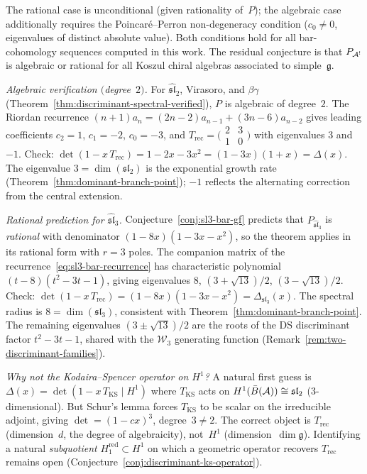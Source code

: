 \begin{remark}%
\label{rem:discriminant-spectral-scope}
The rational case is unconditional (given rationality of~$P$);
the algebraic case additionally requires the Poincar\'e--Perron
non-degeneracy condition ($c_0 \neq 0$, eigenvalues of distinct
absolute value).  Both conditions hold for all bar-cohomology
sequences computed in this work.  The residual conjecture is
that $P_{\mathcal{A}^!}$ is algebraic or rational for all Koszul chiral
algebras associated to simple~$\mathfrak{g}$.

\emph{Algebraic verification $($degree~$2)$.}
For $\widehat{\mathfrak{sl}}_2$, Virasoro, and $\beta\gamma$
(Theorem~\ref{thm:discriminant-spectral-verified}), $P$ is
algebraic of degree~$2$.
The Riordan recurrence
$(n{+}1) a_n = (2n{-}2) a_{n-1} + (3n{-}6) a_{n-2}$
gives leading coefficients $c_2 = 1$, $c_1 = -2$, $c_0 = -3$,
and $T_{\mathrm{rec}} = \bigl(\begin{smallmatrix} 2 & 3 \\ 1 &
0 \end{smallmatrix}\bigr)$ with eigenvalues $3$ and $-1$.
Check: $\det(1 - x\,T_{\mathrm{rec}}) = 1 - 2x - 3x^2
= (1-3x)(1+x) = \Delta(x)$.  The eigenvalue
$3 = \dim(\mathfrak{sl}_2)$ is the exponential growth rate
(Theorem~\ref{thm:dominant-branch-point});
$-1$ reflects the alternating correction from the central
extension.

\emph{Rational prediction for $\widehat{\mathfrak{sl}}_3$.}
Conjecture~\ref{conj:sl3-bar-gf} predicts that
$P_{\widehat{\mathfrak{sl}}_3}$ is \emph{rational} with
denominator $(1-8x)(1-3x-x^2)$, so the theorem applies
in its rational form with $r = 3$ poles.
The companion matrix of the recurrence~\eqref{eq:sl3-bar-recurrence}
has characteristic polynomial $(t-8)(t^2-3t-1)$, giving
eigenvalues $8$, $(3+\sqrt{13})/2$, $(3-\sqrt{13})/2$.
Check: $\det(1 - x\,T_{\mathrm{rec}})
= (1-8x)(1-3x-x^2) = \Delta_{\mathfrak{sl}_3}(x)$.
The spectral radius is $8 = \dim(\mathfrak{sl}_3)$,
consistent with Theorem~\ref{thm:dominant-branch-point}.
The remaining eigenvalues
$(3 \pm \sqrt{13})/2$ are the roots of the DS discriminant
factor $t^2 - 3t - 1$, shared with the $\mathcal{W}_3$ generating
function (Remark~\ref{rem:two-discriminant-families}).

\emph{Why not the Kodaira--Spencer operator on $H^1$?}
A natural first guess is
$\Delta(x) = \det(1 - x\, T_{\mathrm{KS}} \mid H^1)$
where $T_{\mathrm{KS}}$ acts on
$H^1(\bar{B}(\mathcal{A})) \cong \mathfrak{sl}_2$ ($3$-dimensional).
But Schur's lemma forces $T_{\mathrm{KS}}$ to be scalar on the
irreducible adjoint, giving $\det = (1-cx)^3$, degree~$3 \neq 2$.
The correct object is $T_{\mathrm{rec}}$ (dimension~$d$, the
degree of algebraicity), not~$H^1$ (dimension~$\dim\mathfrak{g}$).
Identifying a natural \emph{subquotient} $H^{\mathrm{red}}_1
\subset H^1$ on which a geometric operator recovers
$T_{\mathrm{rec}}$ remains open
(Conjecture~\ref{conj:discriminant-ks-operator}).


\end{remark}
